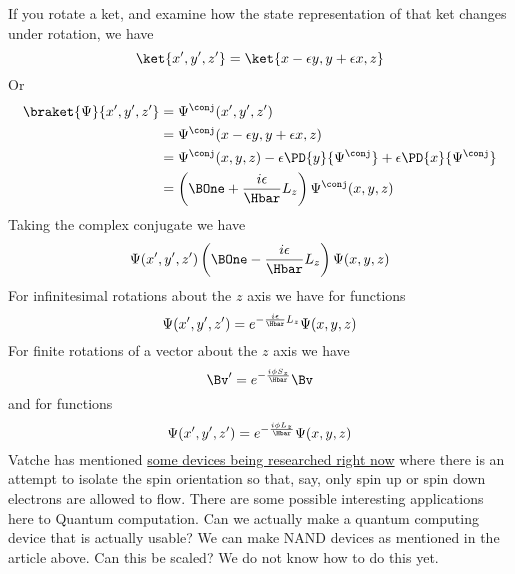 If you rotate a ket, and examine how the state representation of that ket changes under rotation, we have
%
\begin{equation}\label{eqn:PHY356FDec7:140}
\ket{x', y', z'} = \ket{x - \epsilon y, y + \epsilon x, z}
\end{equation}
%
Or
\begin{equation}\label{eqn:lecture12rotationsAndAngularMomentum:320}
\begin{aligned}
\braket{\Psi}{x', y', z'}
&=
\Psi^\conj(x', y', z') \\
&=
\Psi^\conj(x - \epsilon y, y + \epsilon x, z) \\
&=
\Psi^\conj(x , y , z)
- \epsilon \PD{y}{\Psi^\conj}
+ \epsilon \PD{x}{\Psi^\conj} \\
&=
\left( \BOne + \frac{i \epsilon} {\Hbar} L_z \right) \Psi^\conj(x , y , z)
\end{aligned}
\end{equation}
%
Taking the complex conjugate we have
\begin{equation}\label{eqn:PHY356FDec7:150}
\Psi(x', y', z')
\left( \BOne - \frac{i \epsilon} {\Hbar} L_z \right) \Psi(x , y , z)
\end{equation}
%
For infinitesimal rotations about the \(z\) axis we have for functions
\begin{equation}\label{eqn:PHY356FDec7:160}
\Psi(x', y', z')
=
e^{ - \frac{i \epsilon} {\Hbar} L_z } \Psi(x , y , z)
\end{equation}
%
For finite rotations of a vector about the \(z\) axis we have
\begin{equation}\label{eqn:PHY356FDec7:170}
\Bv'
=
e^{ -\frac{i \phi S_z} {\Hbar} } \Bv
\end{equation}
%
and for functions
\begin{equation}\label{eqn:PHY356FDec7:180}
\Psi(x', y', z')
=
e^{ - \frac{i \phi L_z} {\Hbar} } \Psi(x , y , z)
\end{equation}
%
Vatche has mentioned \href{https://plato.stanford.edu/entries/qt-quantcomp/#QuanGate}{some devices being researched right now} where there is an attempt to isolate the spin orientation so that, say, only spin up or spin down electrons are allowed to flow.  There are some possible interesting applications here to Quantum computation.  Can we actually make a quantum computing device that is actually usable?  We can make NAND devices as mentioned in the article above.  Can this be scaled?  We do not know how to do this yet.


